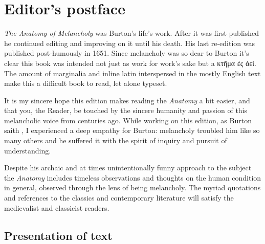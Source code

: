 \chapter{Editor's postface}

\emph{The Anatomy of Melancholy} was Burton's life's work. After it was first published he continued editing and improving on it until his death. His last re-edition was published post-humously in 1651. Since melancholy was so dear to Burton it's clear this book was intended not just as work for work's sake but a \textgreek{κτῆμα ἐς ἀεί}. The amount of marginalia and inline latin interspersed in the mostly English text make this a difficult book to read, let alone typeset.

It is my sincere hope this edition makes reading the \emph{Anatomy} a bit easier, and that you, the Reader, be touched by the sincere humanity and passion of this melancholic voice from centuries ago. While working on this edition, as Burton saith , I experienced a deep empathy for Burton: melancholy troubled him like so many others and he suffered it with the spirit of inquiry and pursuit of understanding.

Despite his archaic and at times unintentionally funny approach to the subject the \emph{Anatomy} includes timeless observations and thoughts on the human condition in general, observed through the lens of being melancholy. The myriad quotations and references to the classics and contemporary literature will satisfy the medievalist and classicist readers.

\section*{Presentation of text}

